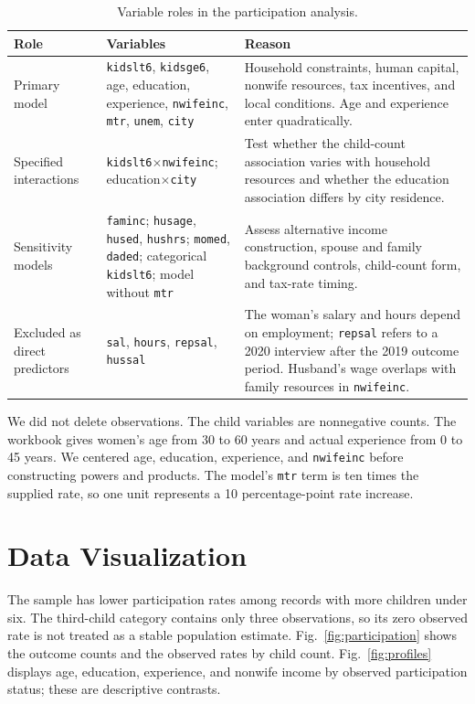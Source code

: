 \documentclass[conference]{IEEEtran}
\begin{document}
\begin{table}[!t]
\centering
\caption{Variable roles in the participation analysis.}
\label{tab:variables}
\small
\begin{tabularx}{\textwidth}{>{\raggedright\arraybackslash}p{}>{\raggedright\arraybackslash}p{}>{\raggedright\arraybackslash}X}
\toprule
Role & Variables & Reason \\
\midrule
Primary model & \texttt{kidslt6}, \texttt{kidsge6}, age, education, experience, \texttt{nwifeinc}, \texttt{mtr}, \texttt{unem}, \texttt{city} & Household constraints, human capital, nonwife resources, tax incentives, and local conditions. Age and experience enter quadratically. \\
Specified interactions & \texttt{kidslt6}$\times$\texttt{nwifeinc}; education$\times$\texttt{city} & Test whether the child-count association varies with household resources and whether the education association differs by city residence. \\
Sensitivity models & \texttt{faminc}; \texttt{husage}, \texttt{hused}, \texttt{hushrs}; \texttt{momed}, \texttt{daded}; categorical \texttt{kidslt6}; model without \texttt{mtr} & Assess alternative income construction, spouse and family background controls, child-count form, and tax-rate timing. \\
Excluded as direct predictors & \texttt{sal}, \texttt{hours}, \texttt{repsal}, \texttt{hussal} & The woman's salary and hours depend on employment; \texttt{repsal} refers to a 2020 interview after the 2019 outcome period. Husband's wage overlaps with family resources in \texttt{nwifeinc}. \\
\bottomrule
\end{tabularx}
\end{table}

We did not delete observations. The child variables are nonnegative counts. The workbook gives women's age from 30 to 60 years and actual experience from 0 to 45 years. We centered age, education, experience, and \texttt{nwifeinc} before constructing powers and products. The model's \texttt{mtr} term is ten times the supplied rate, so one unit represents a 10 percentage-point rate increase.

\section{Data Visualization}
The sample has lower participation rates among records with more children under six. The third-child category contains only three observations, so its zero observed rate is not treated as a stable population estimate. Fig.~\ref{fig:participation} shows the outcome counts and the observed rates by child count. Fig.~\ref{fig:profiles} displays age, education, experience, and nonwife income by observed participation status; these are descriptive contrasts.
\end{document}
